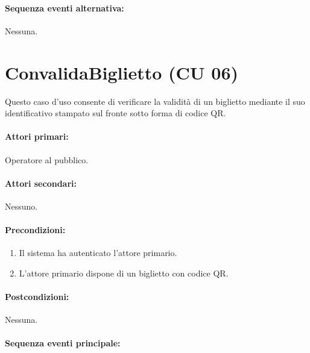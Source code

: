 \documentclass{article}
\begin{document}
	\paragraph{Sequenza eventi alternativa:}Nessuna.
















\newpage 

		\section*{ConvalidaBiglietto (CU 06)}
	
	\indent\indent Questo caso d'uso consente di verificare la validità di un biglietto mediante il suo identificativo stampato  sul fronte sotto forma di codice QR. 
	
	\paragraph{Attori primari:}Operatore al pubblico.
	
	\paragraph{Attori secondari:}Nessuno.
	
	\paragraph{Precondizioni:}
			\begin{enumerate}	[itemsep=8pt,parsep=0pt]
				\item Il sistema ha autenticato l'attore primario.
				\item L'attore primario dispone di un biglietto con codice QR.
  			\end{enumerate}	
	
	\paragraph{Postcondizioni:}Nessuna.
	
	\paragraph{Sequenza eventi principale:}
\end{document}
